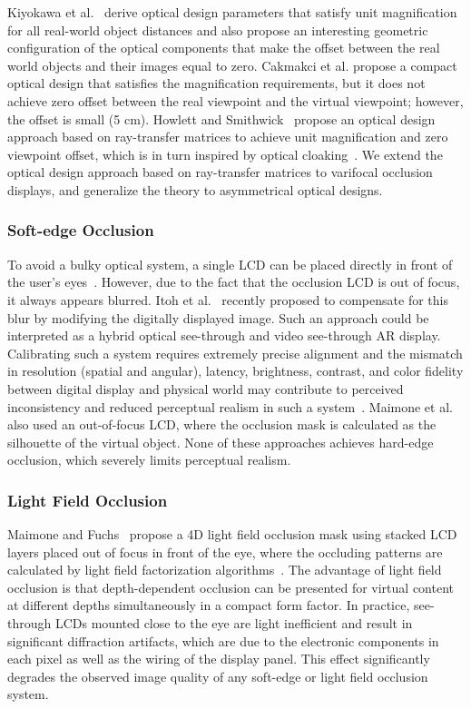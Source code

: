 Kiyokawa et al.~\cite{Kiyokawa2003} derive optical design parameters that satisfy unit magnification for all real-world object distances and also propose an interesting geometric configuration of the optical components that make the offset between the real world objects and their images equal to zero.
Cakmakci et al. \cite{Cakmakci2004} propose a compact optical design that satisfies the magnification requirements, but it does not achieve zero offset between the real viewpoint and the virtual viewpoint; however, the offset is small (5 cm). 
Howlett and Smithwick~\cite{Howlett2017} propose an optical design approach based on ray-transfer matrices to achieve unit magnification and zero viewpoint offset, which is in turn inspired by optical cloaking~\cite{Choi2015}.
We extend the optical design approach based on ray-transfer matrices to varifocal occlusion displays, and generalize the theory to asymmetrical optical designs.  

\subsubsection{Soft-edge Occlusion} 

To avoid a bulky optical system, a single LCD can be placed directly in front of the user's eyes~\cite{Wetzstein2010,Itoh2017}. However, due to the fact that the occlusion LCD is out of focus, it always appears blurred. Itoh et al.~\cite{Itoh2017} recently proposed to compensate for this blur by modifying the digitally displayed image.
Such an approach could be interpreted as a hybrid optical see-through and video see-through AR display. 
Calibrating such a system requires extremely precise alignment and the mismatch in resolution (spatial and angular), latency, brightness, contrast, and color fidelity between digital display and physical world may contribute to perceived inconsistency and reduced perceptual realism in such a system~\cite{Rolland2000}. 
Maimone et al.~\cite{Maimone2014} also used an out-of-focus LCD, where the occlusion mask is calculated as the silhouette of the virtual object. None of these approaches achieves hard-edge occlusion, which severely limits perceptual realism.

\subsubsection{Light Field Occlusion}
Maimone and Fuchs~\cite{Maimone2013} propose a 4D light field occlusion mask using stacked LCD layers placed out of focus in front of the eye, where the occluding patterns are calculated by light field factorization algorithms~\cite{Lanman2010, Wetzstein2012}. 
The advantage of light field occlusion is that depth-dependent occlusion can be presented for virtual content at different depths simultaneously in a compact form factor. 
In practice, see-through LCDs mounted close to the eye are light inefficient and result in significant diffraction artifacts, which are due to the electronic components in each pixel as well as the wiring of the display panel. This effect significantly degrades the observed image quality of any soft-edge or light field occlusion system. 

